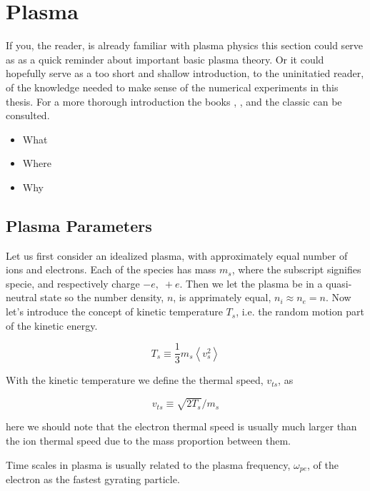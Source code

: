 \section{Plasma}
	\label{sec:plasma}
    If you, the reader, is already familiar with plasma physics this section could serve as
    as a quick reminder about important basic plasma theory. Or it could hopefully
    serve as a too short and shallow introduction, to the uninitatied reader,
    of the knowledge needed to make sense of the numerical experiments in this
    thesis. For a more thorough introduction the books \textit{}
    \citep{fitzpatrick_plasma_2014}, \textit{} \citep{goldston_introduction_1995},
    \textit{} \citep{pecseli_waves_2012} and the classic
    \textit{} \citep{chen_introduction_1984} can be consulted.


    \begin{itemize}
        \item What
        \item Where
        \item Why
    \end{itemize}

    \subsection{Plasma Parameters}
		\label{sec:parameters}
        Let us first consider an idealized plasma, with approximately equal number
        of ions and electrons. Each of the species has mass \(m_s\), where the
        subscript signifies specie, and respectively charge \(-e, \; +e\). Then we let the plasma be in a quasi-neutral state
        so the number density, \(n\), is apprimately equal, \(n_i\approx n_e = n\).
        Now let's introduce the concept of kinetic temperature \(T_s\), i.e. the random
        motion part of the kinetic energy.

        \[T_s \equiv \frac{1}{3}m_s \left< v_s^2 \right> \]

        With the kinetic temperature we define the thermal speed, \(v_{ts}\), as

        \[ v_{ts} \equiv \sqrt{2T_s}/m_s \]

        here we should note that the electron thermal speed is usually much larger
        than the ion thermal speed due to the mass proportion between them.

        Time scales in plasma is usually related to the plasma frequency, \(\omega_{pe}\), of the
        electron as the fastest gyrating particle.

